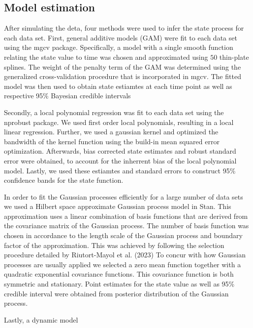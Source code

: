 \subsection{Model estimation}

After simulating the deta, four methods were used to infer the state process for 
each data set. First, general additive models (GAM) were fit to each data set 
using the mgcv package. Specifically, a model with a single smooth function 
relating the state value to time was chosen and approximated using $50$ 
thin-plate splines. The weight of the penalty term of the GAM was determined 
using the generalized cross-validation procedure that is incorporated in mgcv. 
The fitted model was then used to obtain state estiamtes at each time point as 
well as respective 95\% Bayesian credible intervals 

Secondly, a local polynomial regression was fit to each data set using the 
nprobust package. We used first order local polynomials, resulting in a local 
linear regression. Further, we used a gaussian kernel and optimized the bandwidth 
of the kernel function using the build-in mean squared error optimization. Afterwards, 
bias corrected state estimates and robust standard error were obtained, to 
account for the inherrent bias of the local polynomial model. Lastly, we used 
these estiamtes and standard errors to construct 95\% confidence bands for the
state function. 

In order to fit the Gaussian processes efficiently for a large number of data 
sets we used a Hilbert space approximate Gaussian process model in Stan.
This approximation uses a linear combination of basis functions that are derived 
from the covariance matrix of the Gaussian process. The number of basis 
function was chosen in accordance to the length scale of the 
Gaussian process and boundary factor of the approximation. This was achieved 
by following the selection procedure detailed by Riutort-Mayol et al. (2023) 
To concur with how Gaussian 
processes are usually applied we selected a zero mean function together with a 
quadratic exponential covariance functions. This covariance function is both symmetric and 
stationary. Point estimates for the state value as well as 95\% credible interval 
were obtained from posterior distribution of the Gaussian process. 

Lastly, a dynamic model 